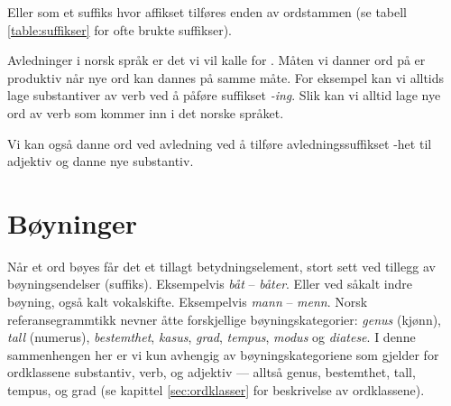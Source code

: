 

Eller som et suffiks hvor affikset tilføres enden av ordstammen (se tabell \ref{table:suffikser} for ofte brukte suffikser).



Avledninger i norsk språk er det vi vil kalle for . Måten vi danner ord på er produktiv når nye ord kan dannes på samme måte. For eksempel kan vi alltids lage substantiver av verb ved å påføre suffikset \textit{-ing}. Slik kan vi alltid lage nye ord av verb som kommer inn i det norske språket.


Vi kan også danne ord ved avledning ved å tilføre avledningssuffikset -het til adjektiv og danne nye substantiv.


\section{Bøyninger}

Når et ord bøyes får det et tillagt betydningselement, stort sett ved tillegg av bøyningsendelser (suffiks). Eksempelvis \textit{båt} -- \textit{båter}. Eller ved såkalt indre bøyning, også kalt vokalskifte. Eksempelvis \textit{mann} -- \textit{menn}. Norsk referansegrammtikk \cite{faarlund1997norsk} nevner åtte forskjellige bøyningskategorier: \textit{genus} (kjønn), \textit{tall} (numerus), \textit{bestemthet}, \textit{kasus}, \textit{grad}, \textit{tempus}, \textit{modus} og \textit{diatese}. I denne sammenhengen her er vi kun avhengig av bøyningskategoriene som gjelder for ordklassene substantiv, verb, og adjektiv --- alltså genus, bestemthet, tall, tempus, og grad (se kapittel \ref{sec:ordklasser} for beskrivelse av ordklassene).


